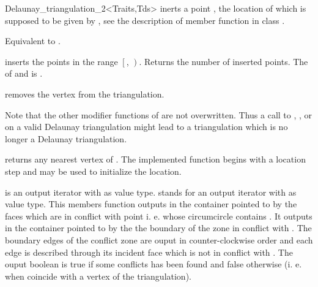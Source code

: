 \begin{ccRefClass}{Delaunay_triangulation_2<Traits,Tds>}
{ inerts a point , the location of which is supposed to be
given by , see the description of member function
 in class .}

{Equivalent to .}

{inserts the points in the range
 $\left[\right.$, $\left.\right)$.
 Returns the number of inserted points.
 \ccPrecond The  of  and 
 is .}



{removes the vertex from the triangulation.}

Note that the other modifier functions  of
 are not overwritten.
Thus a  call to 
, ,
  or 
on a valid Delaunay triangulation might lead to a triangulation
which is no longer a Delaunay triangulation.


{returns any nearest vertex of . The implemented function
begins with a location step and
 may be used to initialize the location.}

{  is an output iterator with  as value type.
 stands for an output iterator with  as value type.
This members function outputs in the container pointed to by 
the faces which are in conflict with point 
i. e. whose circumcircle contains .
It outputs in the container pointed to by  the 
the boundary of the zone in conflict with .
The boundary edges
of the conflict  zone are ouput in counter-clockwise order
and each edge is described  through its incident face
which is not in conflict with .
The ouput boolean is true if some conflicts has been found and false
otherwise
(i. e. when  coincide with a vertex of the triangulation).}


\end{ccRefClass}
